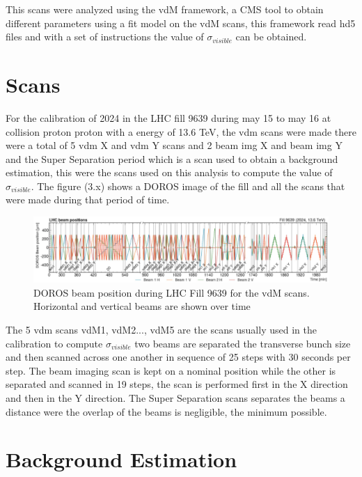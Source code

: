 This scans were analyzed using the vdM framework, a CMS tool to obtain different parameters using a fit model on the vdM scans, this framework read hd5 files and with a set of instructions the value of $\sigma_{visible}$ can be obtained. 
 
\section{Scans}

For the calibration of 2024 in the LHC fill 9639 during may 15 to may 16 at collision proton proton with a energy of 13.6 TeV, the vdm scans were made there were a total of 5 vdm X and vdm Y scans and 2 beam img X and beam img Y and the Super Separation period which is a scan used to obtain a background estimation, this were the scans used on this analysis to compute the value of $\sigma_{visible}$. The figure (3.x) shows a DOROS image of the fill and all the scans that were made during that period of time. 

\begin{figure}[h]
    \centering
    \includegraphics[width=1\textwidth]{scans.png}
    \caption[Doros for fill 9639]{DOROS beam position during LHC Fill 9639 for the vdM scans. Horizontal and vertical beams are shown over time}
    \label{fig:scans}
\end{figure}

The 5 vdm scans vdM1, vdM2..., vdM5 are the scans usually used in the calibration to compute $\sigma_{visible}$ two beams are separated the transverse bunch size and then scanned across one another in sequence of 25 steps with 30 seconds per step. The beam imaging scan is kept on a nominal position while the other is separated and scanned in 19 steps, the scan is performed first in the X direction and then in the Y direction. The Super Separation scans separates the beams a distance were the overlap of the beams is negligible, the minimum possible.

\section{Background Estimation}

